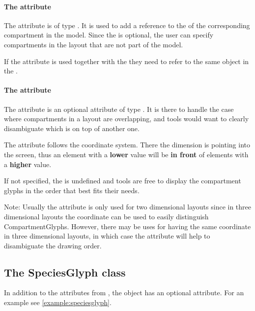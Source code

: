 \paragraph{The  attribute}
The  attribute is of type . It 
is used to add a reference to the  of the corresponding 
compartment in the model. Since the  is optional, the 
user can specify compartments in the layout that are not part of the 
model. 

If the  attribute is used together with the  
they need to refer to the same object in the \Model.

\paragraph{The  attribute}
The  attribute is an optional attribute of type 
. It is there to handle the case where compartments in 
a layout are overlapping, and tools would want to clearly disambiguate 
which \CompartmentGlyph is on top of another one. 

The  attribute follows the coordinate system. There 
the  dimension is pointing into the screen, thus an element 
with a \textbf{lower}  value will be \textbf{in front} of 
elements with a \textbf{higher} value.

If not specified, the  is undefined and tools are free to 
display the compartment glyphs in the order that best fits their needs. 

Note: Usually the  attribute is only used for two dimensional
layouts since in three dimensional layouts the  coordinate can be
used to easily distinguish CompartmentGlyphs. However, there may be uses 
for having the same  coordinate in three dimensional layouts, in 
which case the  attribute will help to disambiguate the drawing
order. 

\subsection{The SpeciesGlyph class}
\label{speciesglyph-class}
In addition to the attributes from \GraphicalObject, the \SpeciesGlyph 
object has an optional  attribute. For an example see 
\ref{example:speciesglyph}.

